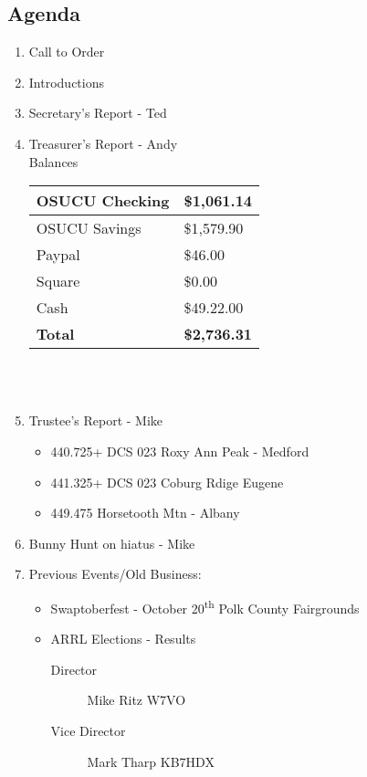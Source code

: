 \documentclass[letter,11pt]{extarticle}
\begin{document}
	\subsection*{Agenda}
	\begin{enumerate}
		\item Call to Order
		\item Introductions
		\item Secretary's Report - Ted
		\item Treasurer's Report - Andy \\
				Balances 
			\begin{tabular}{|l|l|} \hline
				OSUCU Checking & \$1,061.14 \\ \hline
				OSUCU Savings & \$1,579.90 \\ \hline
				Paypal & \$46.00 \\ \hline
				Square & \$0.00 \\ \hline
				Cash & \$49.22.00 \\ \hline
				\textbf{Total} & \textbf{\$2,736.31} \\ \hline
			\end{tabular} \\ \\
		\item Trustee's Report - Mike
			\begin{itemize}
				\item 440.725+ DCS 023 Roxy Ann Peak - Medford
				\item 441.325+ DCS 023 Coburg Rdige Eugene
				\item 449.475 Horsetooth Mtn - Albany
			\end{itemize}
		\item Bunny Hunt on hiatus - Mike
		\item Previous Events/Old Business:
		\begin{itemize}
			\item Swaptoberfest - October 20\textsuperscript{th} Polk County Fairgrounds
			\item ARRL Elections - Results
				\begin{description}
					\item[Director] Mike Ritz W7VO
					\item[Vice Director] Mark Tharp KB7HDX
				\end{description}
		\end{itemize}
			

\end{enumerate}
\end{document}
